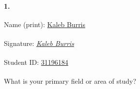 

\usepackage[]{mdframed}


\renewcommand\classname{STAT F300 Statistics, Dr. Short}

\renewcommand\assignment{Homework 1, Due Friday, January 20, 23:59}



    \iffalse
    \begin{equation*}
        \begin{gathered}
            Equations go here.
        \end{gathered}
    \end{equation*}

    \resizebox{\hsize}{!}{$Long equation goes here$}

    \begin{multicol*}{# of columns}
    \end{multicol*}

    \horizontal

    \fi


    \renewcommand{\pointsize}{12pt}

    \paragraph{1.} Name (print): \underline{Kaleb Burris}
    
    \paragraph{ } Signature: \underline{\emph{Kaleb Burris}}
        
    \paragraph{ } Student ID: \underline{31196184}
        
    \paragraph{ }    What is your primary field or area of study?
        \\ 
        

